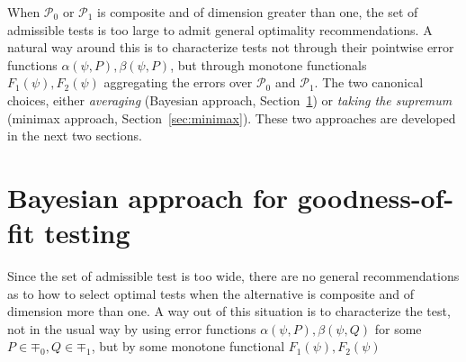 When $\mathcal{P}_0$ or $\mathcal{P}_1$ is composite and of dimension greater than one,
the set of admissible tests is too large to admit general optimality recommendations.
A natural way around this is to characterize tests not through their pointwise error
functions $\alpha(\psi, P), \beta(\psi, P)$, but through monotone functionals $F_1(\psi),
F_2(\psi)$ aggregating the errors over $\mathcal{P}_0$ and $\mathcal{P}_1$. The two
canonical choices, either  \emph{averaging} (Bayesian approach, Section~\ref{sec:bayesian}) or
\emph{taking the supremum} (minimax approach, Section~\ref{sec:minimax}). These two approaches are developed
in the next two sections.

\section{Bayesian approach for goodness-of-fit testing}\label{sec:bayesian}
Since the set of admissible test is too wide, there are no general recommendations as to how to select optimal tests when the alternative is composite and of dimension more than one.
A way out of this situation is to characterize the test, not in the usual way by using error functions $\alpha(\psi,P),\beta(\psi,Q)$ for some $P\in \mp_0, Q\in\mp_1$, but by some monotone functional $F_1(\psi),F_2(\psi)$
